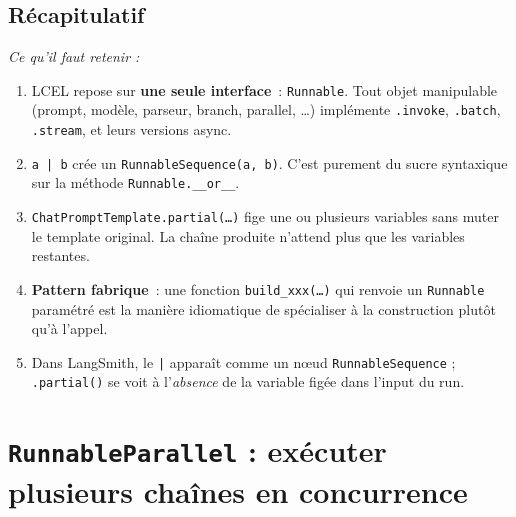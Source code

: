 \documentclass[11pt,a4paper]{article}
\begin{document}
\subsection*{Récapitulatif}
{\itshape\sloppy
\textit{Ce qu'il faut retenir :}
\begin{enumerate}[leftmargin=*]
  \item LCEL repose sur \textbf{une seule interface}~: \texttt{Runnable}.
        Tout objet manipulable (prompt, modèle, parseur, branch, parallel,
        \dots) implémente \texttt{.invoke}, \texttt{.batch},
        \texttt{.stream}, et leurs versions async.
  \item \texttt{a | b} crée un \texttt{RunnableSequence(a, b)}. C'est
        purement du sucre syntaxique sur la méthode
        \texttt{Runnable.\_\_or\_\_}.
  \item \texttt{ChatPromptTemplate.partial(\dots)} fige une ou plusieurs
        variables sans muter le template original. La chaîne produite
        n'attend plus que les variables restantes.
  \item \textbf{Pattern fabrique}~: une fonction \texttt{build\_xxx(\dots)}
        qui renvoie un \texttt{Runnable} paramétré est la manière idiomatique
        de spécialiser à la construction plutôt qu'à l'appel.
  \item Dans LangSmith, le \texttt{|} apparaît comme un nœud
        \texttt{RunnableSequence} ; \texttt{.partial()} se voit à
        l'\emph{absence} de la variable figée dans l'input du run.
\end{enumerate}
\par}

\section{\texttt{RunnableParallel} : exécuter plusieurs chaînes en concurrence}
\end{document}
